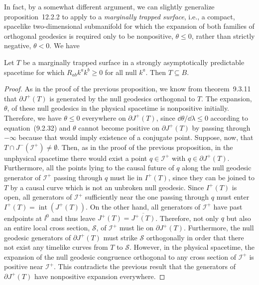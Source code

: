 In fact, by a somewhat different argument, we can slightly generalize
proposition~12.2.2 to apply to a \emph{marginally trapped surface}, i.e., a compact,
spacelike two-dimensional submanifold for which the expansion of both families of
orthogonal geodesics is required only to be nonpositive, \(\theta\le0\), rather than
strictly negative, \(\theta<0\). We have

\begin{proposition}\label{prop:12.2.3}
Let \(T\) be a marginally trapped surface in a strongly asymptotically predictable
spacetime for which \(R_{ab}k^ak^b\ge0\) for all null \(k^a\). Then \(T\subseteq B\).
\end{proposition}
\begin{proof}
As in the proof of the previous proposition, we know from theorem~9.3.11 that
\(\partial J^+(T)\) is generated by the null geodesics orthogonal to \(T\). The
expansion, \(\theta\), of these null geodesics in the physical spacetime is
nonpositive initially. Therefore, we have \(\theta\le0\) everywhere on
\(\partial J^+(T)\), since \(\dd\theta/\dd\lambda\le0\) according to
equation~(9.2.32) and \(\theta\) cannot become positive on \(\partial J^+(T)\) by
passing through \(-\infty\) because that would imply existence of a conjugate point.
Suppose, now, that \(T\cap J^-(\mathcal I^+)\ne\emptyset\). Then, as in the proof
of the previous proposition, in the unphysical spacetime there would exist a point
\(q\in\mathcal I^+\) with \(q\in\partial J^+(T)\). Furthermore, all the points
lying to the causal future of \(q\) along the null geodesic generator of
\(\mathcal I^+\) passing through \(q\) must lie in \(I^+(T)\), since they can be
joined to \(T\) by a causal curve which is not an unbroken null geodesic. Since
\(I^+(T)\) is open, all generators of \(\mathcal I^+\) sufficiently near the one
passing through \(q\) must enter \(I^+(T)=\operatorname{int}(J^+(T))\). On the
other hand, all generators of \(\mathcal I^+\) have past endpoints at \(\ii^0\) and
thus leave \(J^+(T)=\overline{J^+(T)}\). Therefore, not only \(q\) but also an
entire local cross section, \(\mathcal S\), of \(\mathcal I^+\) must lie on
\(\partial J^+(T)\). Furthermore, the null geodesic generators of
\(\partial J^+(T)\) must strike \(\mathcal S\) orthogonally in order that there not
exist any timelike curves from \(T\) to \(\mathcal S\). However, in the physical
spacetime, the expansion of the null geodesic congruence orthogonal to any cross
section of \(\mathcal I^+\) is positive near \(\mathcal I^+\). This contradicts the
previous result that the generators of \(\partial J^+(T)\) have nonpositive expansion
everywhere.
\end{proof}

